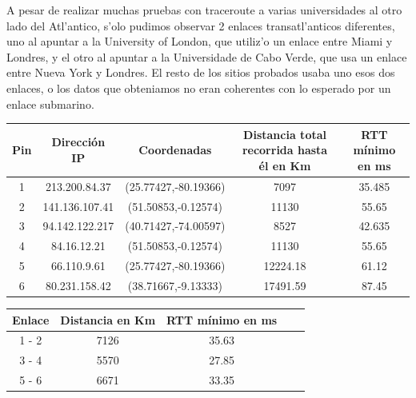 A pesar de realizar muchas pruebas con traceroute a varias universidades al otro lado del Atl'antico, s'olo pudimos observar 2 enlaces transatl'anticos diferentes, uno al apuntar a la University of London, que utiliz'o un enlace entre Miami y Londres, y el otro al apuntar a la Universidade de Cabo Verde, que usa un enlace entre Nueva York y Londres. El resto de los sitios probados usaba uno esos dos enlaces, o los datos que obteniamos no eran coherentes con lo esperado por un enlace submarino.

\noindent \begin{center} \begin{tabular}{| c | c | c | c | c |} \hline 
Pin 	& 	 Dirección IP 	 & 	 Coordenadas 		 & 	 Distancia total recorrida hasta él en Km 	 & 	 RTT mínimo en ms 	\\ \hline 
1 	 	& 	213.200.84.37  & (25.77427,-80.19366)	 & 	 			7097			 & 	 	 	35.485			\\ \hline 
2 		& 	141.136.107.41 & (51.50853,-0.12574)	 & 	 			11130			 & 	 		55.65			\\ \hline 
3 	 	& 	94.142.122.217 & (40.71427,-74.00597)	 & 	  		8527			 & 	 		42.635			\\ \hline 
4 	 	& 	84.16.12.21		 & (51.50853,-0.12574)	 & 	  		11130			 & 	  	55.65				\\ \hline 
5 	 	& 	66.110.9.61		 & 	(25.77427,-80.19366) & 	 12224.18		 & 	61.12  					\\ \hline 
6 	 	& 	80.231.158.42	 & (38.71667,-9.13333)	 & 	 17491.59	 & 	87.45		\\ \hline 
\end{tabular} \end{center}

\noindent \begin{center} \begin{tabular}{| c | c | c | c | c |} \hline 
Enlace 	 &	Distancia en Km 	& 	RTT mínimo en ms	\\ \hline 
1 - 2	 &			7126 	 		& 		35.63			\\ \hline 
3 - 4 	 & 		5570 			&   	27.85			\\ \hline 
5 - 6 	 & 		6671 			&	33.35					\\ \hline 
\end{tabular} \end{center}

